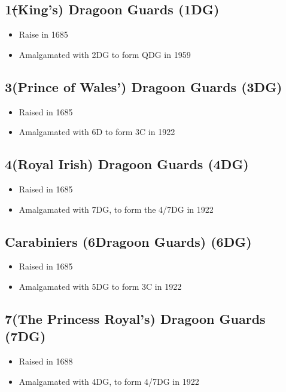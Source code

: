 \subsection*{1\st (King's) Dragoon Guards (1DG)}

\begin{itemize}
\item Raise in 1685
\item Amalgamated with 2DG to form QDG in 1959
\end{itemize}

\subsection*{3\rd (Prince of Wales') Dragoon Guards (3DG)}

\begin{itemize}
\item Raised in 1685
\item Amalgamated with 6D to form 3C in 1922
\end{itemize}

\subsection*{4\nth (Royal Irish) Dragoon Guards (4DG)}

\begin{itemize}
\item Raised in 1685
\item Amalgamated with 7DG, to form the 4/7DG in 1922
\end{itemize}

\subsection*{Carabiniers (6\nth Dragoon Guards) (6DG)}

\begin{itemize}
\item Raised in 1685
\item Amalgamated with 5DG to form 3C in 1922
\end{itemize}

\subsection*{7\nth (The Princess Royal's) Dragoon Guards (7DG)}

\begin{itemize}
\item Raised in 1688
\item Amalgamated with 4DG, to form 4/7DG in 1922
\end{itemize}

